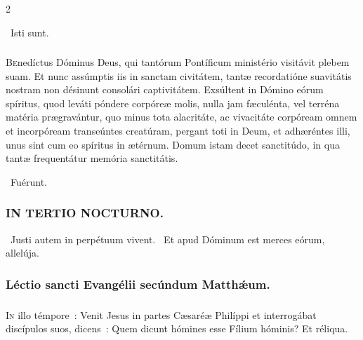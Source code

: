 \documentclass[9pt,twoside]{extarticle}
\begin{document}
\begin{multicols}{2}
\begin{tightlist}{}
~Isti sunt.
\end{tightlist}

\subsubsection*{\center {}}
\lettrine{B}enedíctus Dóminus Deus, qui tantórum Pontíficum ministério visitávit plebem suam. Et nunc assúmptis iis in sanctam civitátem, tantæ recordatióne suavitátis nostram non désinunt consolári captivitátem. Exsúltent in Dómino eórum spíritus, quod leváti póndere corpóreæ molis, nulla jam fæculénta, vel terréna matéria prægravántur, quo minus tota alacritáte, ac vivacitáte corpóream omnem et incorpóream transeúntes creatúram, pergant toti in Deum, et adhæréntes illi, unus sint cum eo spíritus in ætérnum. Domum istam decet sanctitúdo, in qua tantæ frequentátur memória sanctitátis.

\begin{tightlist}{}
\item {}~Fuérunt.
\end{tightlist}

\subsubsection*{\center \textsc{IN TERTIO NOCTURNO.}}
\begin{tightlist}{}
\item {}~Justi autem in perpétuum vivent. ~Et apud Dóminum est merces eórum, allelúja.
\end{tightlist}

\subsubsection*{\center Léctio sancti Evangélii secúndum Matthǽum.}
\subsubsection*{\center {}}
\lettrine{I}n illo témpore~: Venit Jesus in partes Cæsaréæ Philíppi et interrogábat discípulos suos, dicens~: Quem dicunt hómines esse Fílium hóminis? Et réliqua.


\end{multicols}
\end{document}

